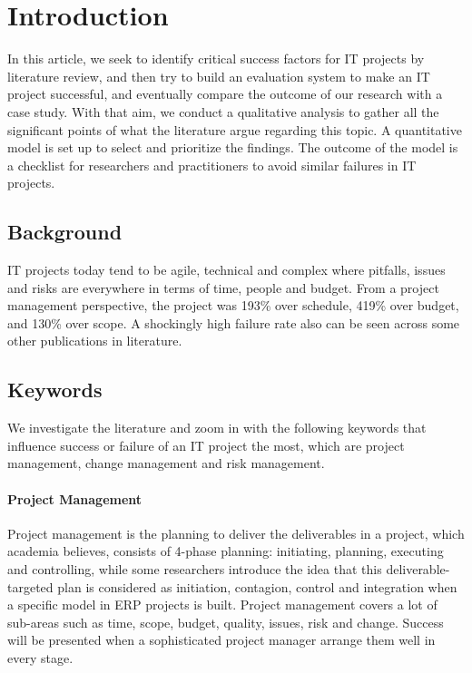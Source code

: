 
\section{Introduction}

In this article, we seek to identify critical success factors for IT projects by literature review, and then try to build an evaluation system to make an IT project successful, and eventually compare the outcome of our research with a case study. With that aim, we conduct a qualitative analysis to gather all the significant points of what the literature argue regarding this topic. A quantitative model is set up to select and prioritize the findings. The outcome of the model is a checklist for researchers and practitioners to avoid similar failures in IT projects.

\subsection{Background}
IT projects today tend to be agile, technical and complex\parencite[p. 2]{4} where pitfalls, issues and risks are everywhere in terms of time, people and budget. From a
project management perspective, the project was 193\% over schedule, 419\% over budget, and 130\% over scope\parencite[p. 8]{6}. A shockingly high failure rate also can be seen across some other publications in literature\parencite{2,3}.

\subsection{Keywords}
We investigate the literature and zoom in with the following keywords that influence success or failure of an IT project the most, which are project management, change management and risk management.

\paragraph{Project Management}
Project management is the planning to deliver the deliverables in a project, which academia believes, consists of 4-phase planning: initiating, planning, executing and controlling, while some researchers introduce the idea that this deliverable-targeted plan is considered as initiation, contagion, control and integration when a specific model in ERP projects is built\parencite[p. 3]{2}. Project management covers a lot of sub-areas such as time, scope, budget, quality, issues, risk and change. Success will be presented when a sophisticated project manager arrange them well in every stage.

